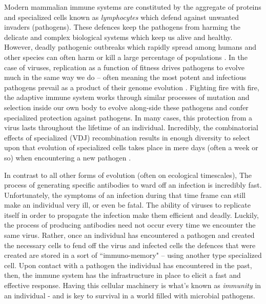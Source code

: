 \documentclass{article}
\begin{document}
Modern mammalian immune systems are constituted by the aggregate of proteins and specialized cells known as \textit{lymphocytes} which
defend against unwanted invaders (pathogens).
These defences keep the pathogens from harming the delicate and complex biological systems which keep us alive and healthy.
However, deadly pathogenic outbreaks which rapidly spread among humans and other species can often harm or kill a large percentage of populations \citep{Wu2020}.
In the case of viruses, replication as a function of fitness drives pathogens to evolve much in the same way we do --
often meaning the most potent and infectious pathogens prevail as a product of their genome evolution \citep{Twiddy2003, Felsenstein1981-zs}.
Fighting fire with fire, the adaptive immune system works through similar processes of mutation and selection inside our own body
to evolve along-side these pathogens and confer specialized protection against pathogens.
In many cases, this protection from a virus lasts throughout the lifetime of an individual.
Incredibly, the combinatorial effects of specialized (VDJ) recombination results in enough diversity to select upon that evolution of specialized cells
takes place in mere days (often a week or so) when encountering a new pathogen \citep{Jung2004}.


In contrast to all other forms of evolution (often on ecological timescales), 
The process of generating specific antibodies to ward off an infection is incredibly fast.
Unfortunately, the symptoms of an infection during that time frame can still make an individual very ill, or even be fatal.
The ability of viruses to replicate itself in order to propagate the infection make them efficient and deadly.
Luckily, the process of producing antibodies need not occur every time we encounter the same virus.
Rather, once an individual has encountered a pathogen and created the necessary cells to fend off the virus and infected cells
the defences that were created are stored in a sort of ``immuno-memory" -- using another type specialized cell.
Upon contact with a pathogen the individual has encountered in the past, then,
the immune system has the infrastructure in place to elicit a fast and effective response.
Having this cellular machinery is what's known as \textit{immunity} in an individual - and is key to survival in a world filled with microbial pathogens.
\end{document}
